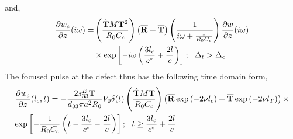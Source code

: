 \documentclass[11pt,letterpaper]{article}%
\begin{document}
and,
\begin{align}
\frac{\partial { w}_c}{\partial z}(i\omega) =
&\left(\frac{{\hat{\bf T}}M{\bf
T}^2}{R_0C_c}\right)\left(\overline{\bf R}+\overline{\bf
T}\right)\left(\frac{1}{i\omega+\frac{1}{R_0C_c}}\right)\frac{\partial
{ w}}{\partial z}(i\omega)
\nonumber\\
&\times\exp\left[-i\omega\left(\frac{3l_c}{c^\ast}+\frac{2l}{c}\right)\right];\
\ \Delta_t > \Delta_c \label{strtotaldef2}
\end{align}
The focused pulse at the defect thus has the following time domain
form,
\begin{align}
&\frac{\partial w_c}{\partial z}(l_c,t) = -\frac{2s^E_{33}{\bf
T}}{d_{33}\pi a^2R_0}V_0\delta(t)\left(\frac{{\hat{\bf T}}M{\bf
T}}{R_0C_c}\right)\left(\overline{\bf R}\exp\left(-2\nu
l_c\right)+\overline{\bf
T}\exp\left(-2\nu l_T\right)\right)\times \nonumber\\
&{\exp}\left[{-\frac{1}{R_0C_c}\left(t-\frac{3l_c}{c^\ast}-\frac{2l}{c}\right)}\right];
\ \ t \geq \frac{3l_c}{c^\ast}+\frac{2l}{c} \label{defecttime1}
\end{align}
\end{document}
